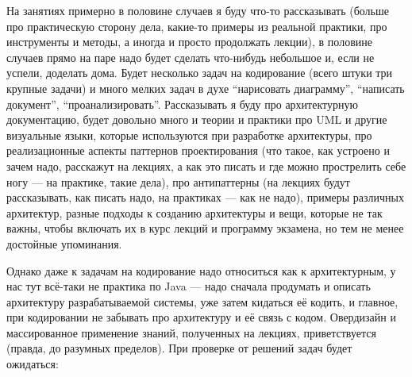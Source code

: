 \documentclass[a5paper]{article}
\begin{document}
На занятиях примерно в половине случаев я буду что-то рассказывать (больше про практическую сторону дела, какие-то примеры из реальной практики, про инструменты и методы, а иногда и просто продолжать лекции), в половине случаев прямо на паре надо будет сделать что-нибудь небольшое и, если не успели, доделать дома. Будет несколько задач на кодирование (всего штуки три крупные задачи) и много мелких задач в духе ``нарисовать диаграмму'', ``написать документ'', ``проанализировать''. Рассказывать я буду про архитектурную документацию, будет довольно много и теории и практики про UML и другие визуальные языки, которые используются при разработке архитектуры, про реализационные аспекты паттернов проектирования (что такое, как устроено и зачем надо, расскажут на лекциях, а как это писать и где можно прострелить себе ногу --- на практике, такие дела), про антипаттерны (на лекциях будут рассказывать, как писать надо, на практиках --- как не надо), примеры различных архитектур, разные подходы к созданию архитектуры и вещи, которые не так важны, чтобы включать их в курс лекций и программу экзамена, но тем не менее достойные упоминания.

Однако даже к задачам на кодирование надо относиться как к архитектурным, у нас тут всё-таки не практика по Java --- надо сначала продумать и описать архитектуру разрабатываемой системы, уже затем кидаться её кодить, и главное, при кодировании не забывать про архитектуру и её связь с кодом. Овердизайн и массированное применение знаний, полученных на лекциях, приветствуется (правда, до разумных пределов). При проверке от решений задач будет ожидаться:\nopagebreak
\end{document}
